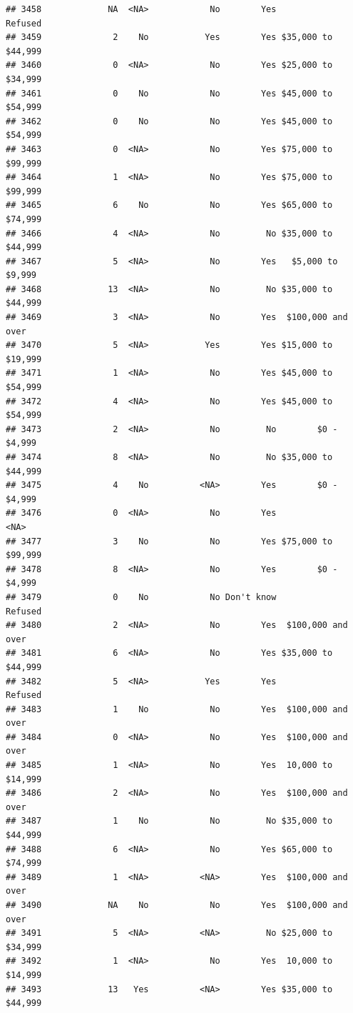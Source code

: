 \documentclass[man]{apa6}
\begin{document}
\begin{verbatim}
## 3458             NA  <NA>            No        Yes            Refused
## 3459              2    No           Yes        Yes $35,000 to $44,999
## 3460              0  <NA>            No        Yes $25,000 to $34,999
## 3461              0    No            No        Yes $45,000 to $54,999
## 3462              0    No            No        Yes $45,000 to $54,999
## 3463              0  <NA>            No        Yes $75,000 to $99,999
## 3464              1  <NA>            No        Yes $75,000 to $99,999
## 3465              6    No            No        Yes $65,000 to $74,999
## 3466              4  <NA>            No         No $35,000 to $44,999
## 3467              5  <NA>            No        Yes   $5,000 to $9,999
## 3468             13  <NA>            No         No $35,000 to $44,999
## 3469              3  <NA>            No        Yes  $100,000 and over
## 3470              5  <NA>           Yes        Yes $15,000 to $19,999
## 3471              1  <NA>            No        Yes $45,000 to $54,999
## 3472              4  <NA>            No        Yes $45,000 to $54,999
## 3473              2  <NA>            No         No        $0 - $4,999
## 3474              8  <NA>            No         No $35,000 to $44,999
## 3475              4    No          <NA>        Yes        $0 - $4,999
## 3476              0  <NA>            No        Yes               <NA>
## 3477              3    No            No        Yes $75,000 to $99,999
## 3478              8  <NA>            No        Yes        $0 - $4,999
## 3479              0    No            No Don't know            Refused
## 3480              2  <NA>            No        Yes  $100,000 and over
## 3481              6  <NA>            No        Yes $35,000 to $44,999
## 3482              5  <NA>           Yes        Yes            Refused
## 3483              1    No            No        Yes  $100,000 and over
## 3484              0  <NA>            No        Yes  $100,000 and over
## 3485              1  <NA>            No        Yes  10,000 to $14,999
## 3486              2  <NA>            No        Yes  $100,000 and over
## 3487              1    No            No         No $35,000 to $44,999
## 3488              6  <NA>            No        Yes $65,000 to $74,999
## 3489              1  <NA>          <NA>        Yes  $100,000 and over
## 3490             NA    No            No        Yes  $100,000 and over
## 3491              5  <NA>          <NA>         No $25,000 to $34,999
## 3492              1  <NA>            No        Yes  10,000 to $14,999
## 3493             13   Yes          <NA>        Yes $35,000 to $44,999

\end{verbatim}
\end{document}
